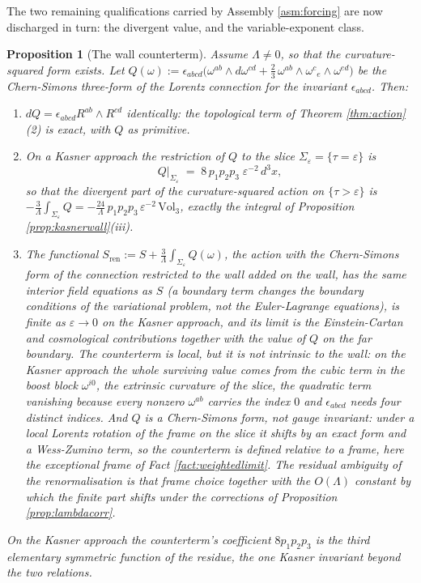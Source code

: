 \documentclass[11pt]{article}
\newtheorem{proposition}[theorem]{Proposition}
\theoremstyle{definition}
\begin{document}
The two remaining qualifications carried by Assembly \ref{asm:forcing} are now discharged in turn: the divergent value, and the variable-exponent class.



\begin{proposition}[The wall counterterm]\label{prop:counterterm}
Assume $\Lambda \neq 0$, so that the curvature-squared form exists. Let $Q(\omega) := \epsilon_{abcd}\bigl(\omega^{ab}\wedge d\omega^{cd} + \tfrac23\,\omega^{ab}\wedge\omega^{c}{}_{e}\wedge\omega^{ed}\bigr)$ be the Chern-Simons three-form of the Lorentz connection for the invariant $\epsilon_{abcd}$. Then:
\begin{enumerate}
\item[(i)] $dQ = \epsilon_{abcd}R^{ab}\wedge R^{cd}$ identically: the topological term of Theorem \ref{thm:action}(2) is exact, with $Q$ as primitive.
\item[(ii)] On a Kasner approach the restriction of $Q$ to the slice $\Sigma_\varepsilon = \{\tau = \varepsilon\}$ is
\[
Q\big|_{\Sigma_\varepsilon} \;=\; 8\,p_1p_2p_3\;\varepsilon^{-2}\, d^3x ,
\]
so that the divergent part of the curvature-squared action on $\{\tau > \varepsilon\}$ is $-\tfrac{3}{\Lambda}\int_{\Sigma_\varepsilon}Q = -\tfrac{24}{\Lambda}\,p_1p_2p_3\,\varepsilon^{-2}\,\mathrm{Vol}_3$, exactly the integral of Proposition \ref{prop:kasnerwall}(iii).
\item[(iii)] The functional $S_{\mathrm{ren}} := S + \tfrac{3}{\Lambda}\int_{\Sigma_\varepsilon}Q(\omega)$, the action with the Chern-Simons form of the connection restricted to the wall added on the wall, has the same interior field equations as $S$ (a boundary term changes the boundary conditions of the variational problem, not the Euler-Lagrange equations), is finite as $\varepsilon \to 0$ on the Kasner approach, and its limit is the Einstein-Cartan and cosmological contributions together with the value of $Q$ on the far boundary. The counterterm is local, but it is not intrinsic to the wall: on the Kasner approach the whole surviving value comes from the cubic term in the boost block $\omega^{i0}$, the extrinsic curvature of the slice, the quadratic term vanishing because every nonzero $\omega^{ab}$ carries the index $0$ and $\epsilon_{abcd}$ needs four distinct indices. And $Q$ is a Chern-Simons form, not gauge invariant: under a local Lorentz rotation of the frame on the slice it shifts by an exact form and a Wess-Zumino term, so the counterterm is defined relative to a frame, here the exceptional frame of Fact \ref{fact:weightedlimit}. The residual ambiguity of the renormalisation is that frame choice together with the $O(\Lambda)$ constant by which the finite part shifts under the corrections of Proposition \ref{prop:lambdacorr}.
\end{enumerate}
On the Kasner approach the counterterm's coefficient $8p_1p_2p_3$ is the third elementary symmetric function of the residue, the one Kasner invariant beyond the two relations.
\end{proposition}
\end{document}
